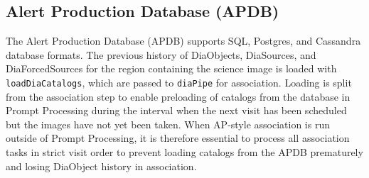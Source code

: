 \subsection{Alert Production Database (APDB)}
\label{sec:apdb}

The Alert Production Database (APDB) supports SQL, Postgres, and Cassandra database formats.
The previous history of DiaObjects, DiaSources, and DiaForcedSources for the region containing the science image is loaded with \texttt{loadDiaCatalogs}, which are passed to \texttt{diaPipe} for association.
Loading is split from the association step to enable preloading of catalogs from the database in Prompt Processing during the interval when the next visit has been scheduled but the images have not yet been taken.
When AP-style association is run outside of Prompt Processing, it is therefore essential to process all association tasks in strict visit order to prevent loading catalogs from the APDB prematurely and losing DiaObject history in association.